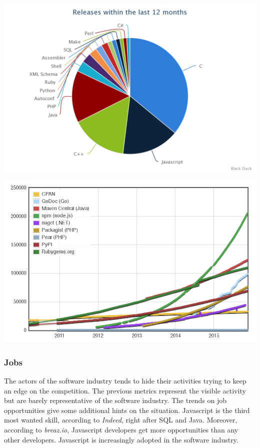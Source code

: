 \includegraphics[width=0.9\linewidth]{../../data/js-trends/black-duck-15}

\includegraphics[width=0.9\linewidth]{../../data/js-trends/modulecounts}

\subsubsection{Jobs}

The actors of the software industry tends to hide their activities trying to keep an edge on the competition.
The previous metrics represent the visible activity but are barely representative of the software industry.
The trends on job opportunities give some additional hints on the situation.
Javascript is the third most wanted skill, according to \textit{Indeed}, right after SQL and Java.
Moreover, according to \textit{breaz.io}, Javascript developers get more opportunities than any other developers.
Javascript is increasingly adopted in the software industry.

